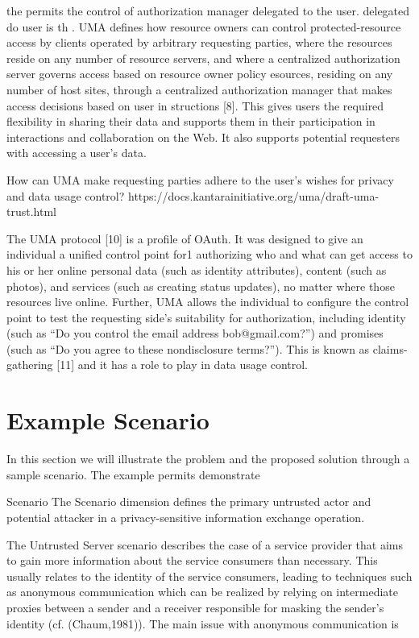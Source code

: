   the   permits the control of authorization manager delegated to the user.  delegated do user is th
  . UMA defines how resource owners can control protected-resource access by clients operated by arbitrary requesting parties, where the resources reside on any number of resource servers, and where a centralized authorization server governs access based on resource owner policy 
  esources,  residing  on  any  number  of  host  sites,  
  through  a  centralized  authorization  manager  that  makes  
  access decisions based on user in
  structions [8]. This gives 
  users  the  required  flexibility  in  sharing  their  data  and  
  supports  them  in  their  participation  in  interactions  and  
  collaboration   on   the   Web.   It   also   supports   potential   
  requesters with accessing a user’s data.
  
  How can UMA make requesting parties adhere to the user's wishes for privacy and data usage control?
  https://docs.kantarainitiative.org/uma/draft-uma-trust.html
  
  The UMA protocol [10] is a profile of OAuth. It was designed to give an individual a unified control point for1 authorizing who and what can get access to his or her online personal data (such as identity attributes), content (such as photos), and services (such as creating status updates), no matter where those resources live online. Further, UMA allows the individual to configure the control point to test the requesting side's suitability for authorization, including identity (such as “Do you control the email address bob@gmail.com?”) and promises (such as “Do you agree to these nondisclosure terms?”). This is known as claims-gathering [11] and it has a role to play in data usage control.



\section{Example Scenario}

In this section we will illustrate the problem and the proposed solution through a sample scenario. The example permits demonstrate 

Scenario The Scenario dimension defines the primary untrusted actor and potential attacker in a privacy-sensitive information exchange operation.

The Untrusted Server scenario describes the case of a service provider that aims to gain more information about the service
consumers than necessary. This usually relates to the identity of the service consumers, leading to techniques such as
anonymous communication which can be realized by relying on intermediate proxies between a sender and a receiver
responsible for masking the sender's identity (cf. (Chaum,1981)). The main issue with anonymous communication is



